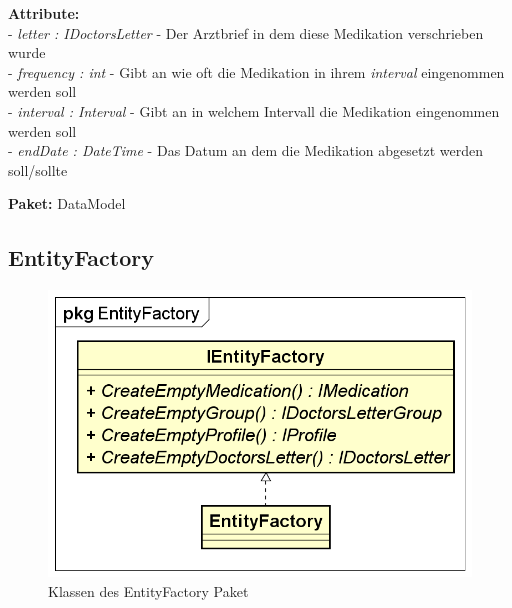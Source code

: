 \documentclass[a4paper]{scrreprt}
\begin{document}
\textbf{Attribute:}\\
- \textit{letter : IDoctorsLetter} - Der Arztbrief in dem diese Medikation verschrieben wurde\\
- \textit{frequency : int} - Gibt an wie oft die Medikation in ihrem \textit{interval} eingenommen werden soll\\
- \textit{interval : Interval} - Gibt an in welchem Intervall die Medikation eingenommen werden soll\\
- \textit{endDate : DateTime} - Das Datum an dem die Medikation abgesetzt werden soll/sollte

\textbf{Paket:} DataModel

\subsection{EntityFactory}
\begin{figure}[H]
\centering
\includegraphics[width=0.55\textheight]{graphics/Klassendiagramme/Model/EntityFactoryPackage.png}
\caption{Klassen des EntityFactory Paket}
\end{figure}
\end{document}
